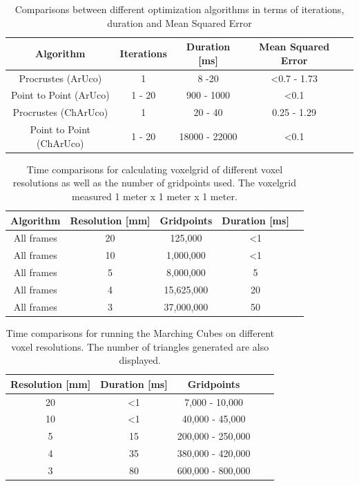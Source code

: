 \documentclass[10pt,twocolumn,letterpaper]{article}
\begin{document}
\begin{table}[h!]
  \begin{center}
    \begin{tabular}{c|c|c|c p{4cm}}
      \textbf{Algorithm} & \textbf{Iterations} & \textbf{Duration [ms]} & \textbf{Mean Squared Error}\\
      \hline
      Procrustes (ArUco) & 1 & 8 -20 & \textless 0.7 - 1.73\\
      Point to Point (ArUco) & 1 - 20 & 900 - 1000 & \textless 0.1\\
      Procrustes (ChArUco) & 1 & 20 - 40 & 0.25 - 1.29\\
      Point to Point (ChArUco) & 1 - 20 & 18000 - 22000 & \textless 0.1\\
    \end{tabular}
     \caption{Comparisons between different optimization algorithms in terms of iterations, duration and Mean Squared Error}
     \label{tab:table1}
  \end{center}
\end{table}

\begin{table}[h!]
  \begin{center}
    \begin{tabular}{c|c|c|c p{4cm}}
      \textbf{Algorithm} & \textbf{Resolution [mm]} & \textbf{Gridpoints} & \textbf{Duration [ms]}\\
      \hline
      All frames & 20 & 125,000 & \textless 1\\
      All frames & 10 & 1,000,000 & \textless 1\\
      All frames & 5 & 8,000,000 & 5\\
      All frames & 4 & 15,625,000 & 20\\
      All frames & 3 & 37,000,000 & 50\\
    \end{tabular}
     \caption{Time comparisons for calculating voxelgrid of different voxel resolutions as well as the number of gridpoints used. The voxelgrid measured 1 meter x 1 meter x 1 meter.}
     \label{tab:table2}
  \end{center}
\end{table}

\begin{table}[h!]
  \begin{center}
    \begin{tabular}{c|c|c|c p{4cm}}
      \textbf{Resolution [mm]} & \textbf{Duration [ms]} & \textbf{Gridpoints}\\
      \hline
      20 & \textless 1 & 7,000 - 10,000\\
      10 & \textless 1 & 40,000 - 45,000\\
      5 & 15 & 200,000 - 250,000\\
      4 & 35 & 380,000 - 420,000\\
      3 & 80 & 600,000 - 800,000\\
    \end{tabular}
     \caption{Time comparisons for running the Marching Cubes on different voxel resolutions. The number of triangles generated are also displayed.}
     \label{tab:table3}
  \end{center}
\end{table}
\end{document}
